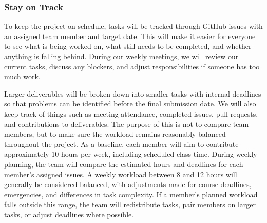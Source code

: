 \documentclass{article}
\begin{document}
\subsubsection*{Stay on Track}




To keep the project on schedule, tasks will be tracked through GitHub issues with an assigned team member and target date. This will make it easier for everyone to see what is being worked on, what still needs to be completed, and whether anything is falling behind. During our weekly meetings, we will review our current tasks, discuss any blockers, and adjust responsibilities if someone has too much work.

\bigskip
Larger deliverables will be broken down into smaller tasks with internal deadlines so that problems can be identified before the final submission date. We will also keep track of things such as meeting attendance, completed issues, pull requests, and contributions to deliverables. The purpose of this is not to compare team members, but to make sure the workload remains reasonably balanced throughout the project. As a
baseline, each member will aim to contribute approximately 10 hours per
week, including scheduled class time. During weekly planning, the team will
compare the estimated hours and deadlines for each member's assigned issues.
A weekly workload between 8 and 12 hours will generally be considered
balanced, with adjustments made for course deadlines, emergencies, and
differences in task complexity. If a member's planned workload falls outside
this range, the team will redistribute tasks, pair members on larger tasks,
or adjust deadlines where possible.
\end{document}
